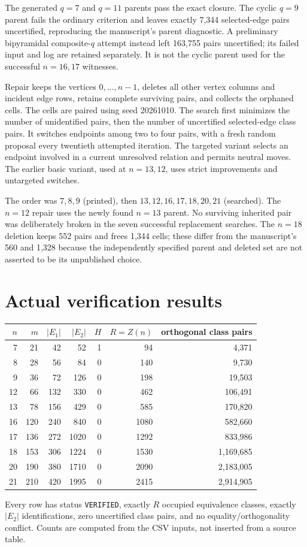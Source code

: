 \documentclass[11pt]{article}
\begin{document}
The generated $q=7$ and $q=11$ parents pass the exact closure. The cyclic
$q=9$ parent fails the ordinary criterion and leaves exactly 7,344
selected-edge pairs uncertified, reproducing the manuscript's parent
diagnostic. A preliminary bipyramidal composite-$q$ attempt instead left
163,755 pairs uncertified; its failed input and log are retained separately.
It is not the cyclic parent used for the successful $n=16,17$ witnesses.

Repair keeps the vertices $0,\ldots,n-1$, deletes all other vertex columns
and incident edge rows, retains complete surviving pairs, and collects the
orphaned cells. The cells are paired using seed 20261010. The search first
minimizes the number of unidentified pairs, then the number of uncertified
selected-edge class pairs. It switches endpoints among two to four pairs,
with a fresh random proposal every twentieth attempted iteration. The
targeted variant selects an endpoint involved in a current unresolved
relation and permits neutral moves. The earlier basic variant, used at
$n=13,12$, uses strict improvements and untargeted switches.

The order was $7,8,9$ (printed), then $13,12,16,17,18,20,21$ (searched).
The $n=12$ repair uses the newly found $n=13$ parent. No surviving inherited
pair was deliberately broken in the seven successful replacement searches.
The $n=18$ deletion keeps 552 pairs and frees 1,344 cells; these differ from
the manuscript's 560 and 1,328 because the independently specified parent
and deleted set are not asserted to be its unpublished choice.

\newpage
\section{Actual verification results}
\begin{center}
\begin{tabular}{rrrrrrr}
\toprule
$n$ & $m$ & $|E_1|$ & $|E_2|$ & $H$ & $R=Z(n)$ & orthogonal class pairs\\
\midrule
7 & 21 & 42 & 52 & 1 & 94 & 4,371 \\
8 & 28 & 56 & 84 & 0 & 140 & 9,730 \\
9 & 36 & 72 & 126 & 0 & 198 & 19,503 \\
12 & 66 & 132 & 330 & 0 & 462 & 106,491 \\
13 & 78 & 156 & 429 & 0 & 585 & 170,820 \\
16 & 120 & 240 & 840 & 0 & 1080 & 582,660 \\
17 & 136 & 272 & 1020 & 0 & 1292 & 833,986 \\
18 & 153 & 306 & 1224 & 0 & 1530 & 1,169,685 \\
20 & 190 & 380 & 1710 & 0 & 2090 & 2,183,005 \\
21 & 210 & 420 & 1995 & 0 & 2415 & 2,914,905 \\
\bottomrule
\end{tabular}
\end{center}
Every row has status \texttt{VERIFIED}, exactly $R$ occupied equivalence
classes, exactly $|E_2|$ identifications, zero uncertified class pairs, and
no equality/orthogonality conflict. Counts are computed from the CSV
inputs, not inserted from a source table.
\end{document}

